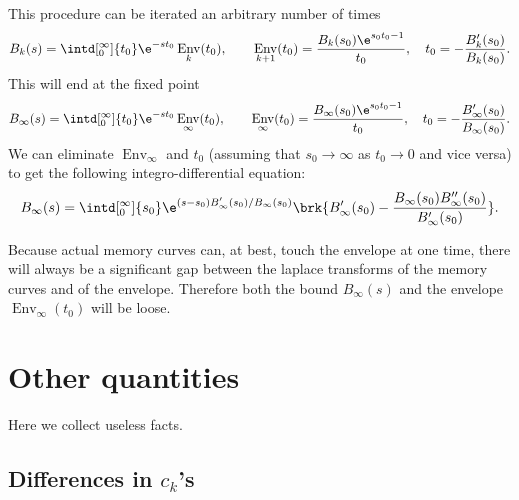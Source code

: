 \documentclass[12pt]{article}
\DeclareMathOperator{\env}{Env}
\begin{document}
This procedure can be iterated an arbitrary number of times
%
\begin{equation}\label{eq:bootiter}
  B_k(s) = \intd[_0^\infty]{t_0} \e^{-st_0}\env_k(t_0),
  \qquad
  \env_{k+1}(t_0)=\frac{B_k(s_0) \e^{s_0t_0-1}}{t_0},
  \quad t_0 = -\frac{B_k'(s_0)}{B_k(s_0)}.
\end{equation}
%
This will end at the fixed point
%
\begin{equation}\label{eq:bootfixedpt}
  B_\infty(s) = \intd[_0^\infty]{t_0} \e^{-st_0}\env_\infty(t_0),
  \qquad
  \env_\infty(t_0)=\frac{B_\infty(s_0) \e^{s_0t_0-1}}{t_0},
  \quad t_0 = -\frac{B_\infty'(s_0)}{B_\infty(s_0)}.
\end{equation}
%
We can eliminate $\env_\infty$ and $t_0$ (assuming that $s_0\to \infty$ as $t_0 \to 0$ and vice versa) to get the following integro-differential equation:
%
\begin{equation}\label{eq:bootbnd}
  B_\infty(s) = \intd[_0^\infty]{s_0} \e^{(s-s_0)B'_\infty(s_0)/B_\infty(s_0)} 
      \brk{B'_\infty(s_0)-\frac{B_\infty(s_0)B''_\infty(s_0)}{B'_\infty(s_0)}}.
\end{equation}
%

Because actual memory curves can, at best, touch the envelope at one time, there will always be a significant gap between the laplace transforms of the memory curves and of the envelope.
Therefore both the bound $B_\infty(s)$ and the envelope $\env_\infty(t_0)$ will be loose.



\appendix
\section{Other quantities}

Here we collect useless facts.

\subsection{Differences in \texorpdfstring{$c_k$}{c(k)}'s}\label{sec:areacoeffdiff}
\end{document}
